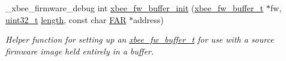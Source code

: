 \begin{DoxyCompactItemize}
\-\_\-xbee\-\_\-firmware\-\_\-debug int \hyperlink{group__xbee__firmware_ga8ac2a394778a985657db3c7f08b12692}{xbee\-\_\-fw\-\_\-buffer\-\_\-init} (\hyperlink{structxbee__fw__buffer__t}{xbee\-\_\-fw\-\_\-buffer\-\_\-t} $\ast$fw, \hyperlink{group__hal__dos_ga09a1e304d66d35dd47daffee9731edaa}{uint32\-\_\-t} \hyperlink{group__zdo_gab2b3adeb2a67e656ff030b56727fd0ac}{length}, const char \hyperlink{group__hal_gaef060b3456fdcc093a7210a762d5f2ed}{F\-A\-R} $\ast$address)
\begin{DoxyCompactList}\small\item\em Helper function for setting up an \hyperlink{structxbee__fw__buffer__t}{xbee\-\_\-fw\-\_\-buffer\-\_\-t} for use with a source firmware image held entirely in a buffer. \end{DoxyCompactList}\end{DoxyCompactItemize}
